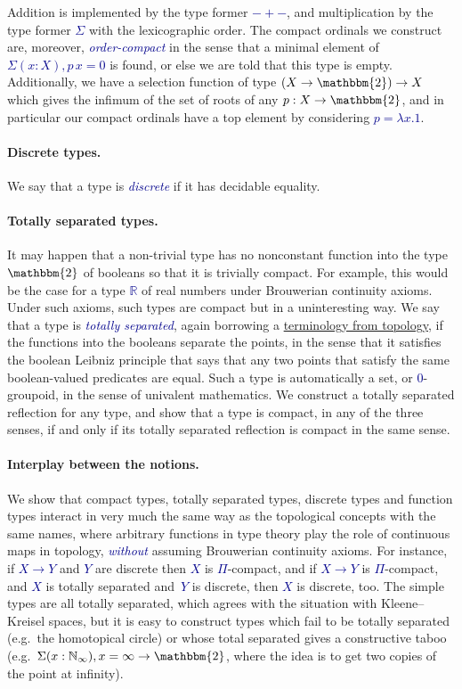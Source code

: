 \documentclass[a4paper]{easychair}
\newcommand{\db}{\textcolor{darkblue}}
\newcommand{\df}[1]{\emph{\db{#1}}}
\newcommand{\m}[1]{\db{$#1$}}
\newcommand{\N}{\mathbb{N}}
\newcommand{\NI}{\N_\infty}
\newcommand{\R}{\mathbb{R}}
\newcommand{\Two}{\mathbbm{2}}
\begin{document}
Addition is implemented by the type former \m{-+-}, and multiplication
by the type former \m{\Sigma} with the lexicographic order. The
compact ordinals we construct are, moreover, \df{order-compact} in the
sense that a minimal element of \m{\Sigma (x : X), p\,x = 0} is found,
or else we are told that this type is empty.  Additionally, we have a
selection function of type \m{(X \to \Two) \to X} which gives the
infimum of the set of roots of any \m{p : X \to \Two}, and in
particular our compact ordinals have a top element by considering \m{p
  = \lambda x. 1}.

\paragraph{Discrete types.}
We say that a type is \df{discrete} if it has decidable equality.

\paragraph{Totally separated types.}
It may happen that a non-trivial type has no nonconstant function into
the type \m{\Two} of booleans so that it is trivially compact. For
example, this would be the case for a type \m{\R} of real numbers
under Brouwerian continuity axioms. Under such axioms, such types are
compact but in a uninteresting way. We say that a type is \df{totally
  separated}, again borrowing a
\href{https://www.encyclopediaofmath.org/index.php/Totally_separated_space}{terminology
  from topology}, if the functions into the booleans separate the
points, in the sense that it satisfies the boolean Leibniz principle
that says that any two points that satisfy the same boolean-valued
predicates are equal. Such a type is automatically a set, or
\m{0}-groupoid, in the sense of univalent mathematics. We construct a
totally separated reflection for any type, and show that a type is
compact, in any of the three senses, if and only if its totally
separated reflection is compact in the same sense.

\paragraph{Interplay between the notions.}
We show that compact types, totally separated types, discrete types
and function types interact in very much the same way as the
topological concepts with the same names, where arbitrary functions in
type theory play the role of continuous maps in topology, \df{without}
assuming Brouwerian continuity axioms. For instance, if \m{X \to Y}
and \m{Y} are discrete then \m{X} is \m{\Pi}-compact, and if \m{X \to
  Y} is \m{\Pi}-compact, and \m{X} is totally separated and~\m{Y} is
discrete, then \m{X} is discrete, too. The simple types are all
totally separated, which agrees with the situation with
Kleene--Kreisel spaces, but it is easy to construct types which fail
to be totally separated (e.g.\ the homotopical circle) or whose total
separated gives a constructive taboo (e.g.\ \m{\Sigma (x : \NI), x =
  \infty \to \Two}, where the idea is to get two copies of the point
at infinity).
\end{document}
